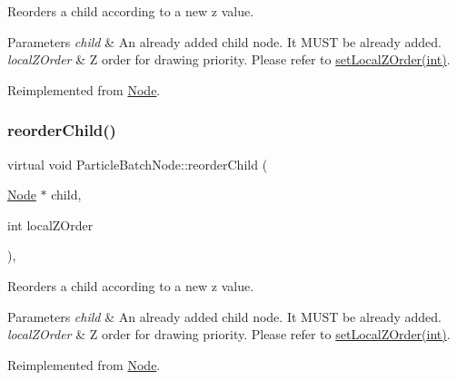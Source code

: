 Reorders a child according to a new z value.


\begin{DoxyParams}{Parameters}
{\em child} & An already added child node. It M\+U\+ST be already added. \\
\hline
{\em local\+Z\+Order} & Z order for drawing priority. Please refer to \hyperlink{classNode_aee4e616c2d55b722226aae1e68b4946f}{set\+Local\+Z\+Order(int)}. \\
\hline
\end{DoxyParams}


Reimplemented from \hyperlink{classNode_a5c9bc72e7f53c1e7f0ef6bc87c07a08f}{Node}.

\mbox{\label{classParticleBatchNode_ab872c436a2cb7058f589aa7d16bcdd06}} 
\subsubsection{\texorpdfstring{reorder\+Child()}{reorderChild()}\hspace{0.1cm}{\footnotesize\ttfamily [2/2]}}
{\footnotesize\ttfamily virtual void Particle\+Batch\+Node\+::reorder\+Child (\begin{DoxyParamCaption}\item[{\hyperlink{classNode}{Node} $\ast$}]{child,  }\item[{int}]{local\+Z\+Order }\end{DoxyParamCaption})\hspace{0.3cm}{\ttfamily [override]}, {\ttfamily [virtual]}}

Reorders a child according to a new z value.


\begin{DoxyParams}{Parameters}
{\em child} & An already added child node. It M\+U\+ST be already added. \\
\hline
{\em local\+Z\+Order} & Z order for drawing priority. Please refer to \hyperlink{classNode_aee4e616c2d55b722226aae1e68b4946f}{set\+Local\+Z\+Order(int)}. \\
\hline
\end{DoxyParams}


Reimplemented from \hyperlink{classNode_a5c9bc72e7f53c1e7f0ef6bc87c07a08f}{Node}.

\mbox{\label{classParticleBatchNode_a00b968ce81dedae01d543bf3772cd91a}} 
